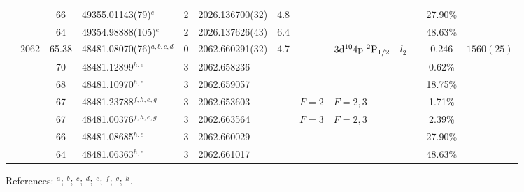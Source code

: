 \begin{table*}
\begin{center}
{\begin{tabular}{:l;l;c;l;c;l;c;l;l;c;c;c;c}
\rowstyle{\itshape}               &        & 66        & 49355.01143(79)$^{e}$            & 2 &   2026.136700(32)  &  4.8 & $                                        $ & $                                        $ & $      $ &              & 27.90\%   & $          $\\
\rowstyle{\itshape}               &        & 64        & 49354.98888(105)$^{e}$           & 2 &   2026.137626(43)  &  6.4 & $                                        $ & $                                        $ & $      $ &              & 48.63\%   & $          $\\
                                  & 2062   & 65.38     & 48481.08070(76)$^{a,b,c,d}$      & 0 &   2062.660291(32)  &  4.7 & $                                        $ & $3\rm{d}^{10}4\rm{p}~^2\rm{P}_{1/2}      $ & $l_{2} $ &              & 0.246     & $ 1560(25) $\\
\rowstyle{\itshape}               &        & 70        & 48481.12899$^{h,e}$              & 3 &   2062.658236      &      & $                                        $ & $                                        $ & $      $ &              & 0.62\%    & $          $\\
\rowstyle{\itshape}               &        & 68        & 48481.10970$^{h,e}$              & 3 &   2062.659057      &      & $                                        $ & $                                        $ & $      $ &              & 18.75\%   & $          $\\
\rowstyle{\itshape}               &        & 67        & 48481.23788$^{f,h,e,g}$          & 3 &   2062.653603      &      & $F=2                                     $ & $F=2,3                                   $ & $      $ &              & 1.71\%    & $          $\\
\rowstyle{\itshape}               &        & 67        & 48481.00376$^{f,h,e,g}$          & 3 &   2062.663564      &      & $F=3                                     $ & $F=2,3                                   $ & $      $ &              & 2.39\%    & $          $\\
\rowstyle{\itshape}               &        & 66        & 48481.08685$^{h,e}$              & 3 &   2062.660029      &      & $                                        $ & $                                        $ & $      $ &              & 27.90\%   & $          $\\
\rowstyle{\itshape}               &        & 64        & 48481.06363$^{h,e}$              & 3 &   2062.661017      &      & $                                        $ & $                                        $ & $      $ &              & 48.63\%   & $          $\\
\hline
\end{tabular}
}
{\footnotesize References:
$^{a}$\citet{Aldenius:2009:014008};
$^{b}$\citet{Pickering:2000:163};
$^{c}$\citet{Ruffoni:2010:424};
$^{d}$\citet{Nave:2012:1570};
$^{e}$\citet{Matsubara:2003:209};
$^{f}$\citet{Campbell:1997:2351};
$^{g}$\citet{Dixit:2008:025001};
$^{h}$\citet{Berengut:2003:022502}.}
\end{center}
\end{table*}
